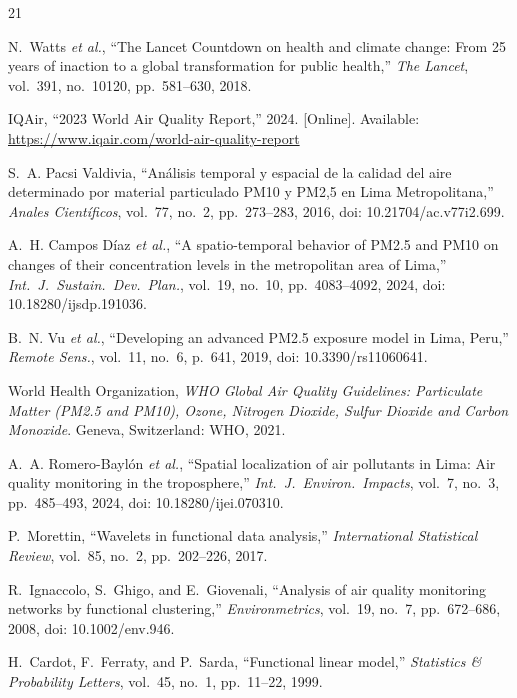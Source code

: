 \documentclass[12pt,letterpaper]{article}
\begin{document}
\begin{thebibliography}{21}

N.~Watts \textit{et al.},
``The Lancet Countdown on health and climate change: From 25 years of inaction to a global transformation for public health,''
\textit{The Lancet}, vol.~391, no.~10120, pp.~581--630, 2018.

IQAir, ``2023 World Air Quality Report,'' 2024. [Online].
Available: \url{https://www.iqair.com/world-air-quality-report}

S.~A. Pacsi Valdivia,
``An\'alisis temporal y espacial de la calidad del aire determinado por material particulado PM10 y PM2,5 en Lima Metropolitana,''
\textit{Anales Cient\'ificos}, vol.~77, no.~2, pp.~273--283, 2016, doi: 10.21704/ac.v77i2.699.

A.~H. Campos D\'iaz \textit{et al.},
``A spatio-temporal behavior of PM2.5 and PM10 on changes of their concentration levels in the metropolitan area of Lima,''
\textit{Int.\ J.\ Sustain.\ Dev.\ Plan.}, vol.~19, no.~10, pp.~4083--4092, 2024, doi: 10.18280/ijsdp.191036.

B.~N. Vu \textit{et al.},
``Developing an advanced PM2.5 exposure model in Lima, Peru,''
\textit{Remote Sens.}, vol.~11, no.~6, p.~641, 2019, doi: 10.3390/rs11060641.

World Health Organization,
\textit{WHO Global Air Quality Guidelines: Particulate Matter (PM2.5 and PM10), Ozone, Nitrogen Dioxide, Sulfur Dioxide and Carbon Monoxide}.
Geneva, Switzerland: WHO, 2021.

A.~A. Romero-Bayl\'on \textit{et al.},
``Spatial localization of air pollutants in Lima: Air quality monitoring in the troposphere,''
\textit{Int.\ J.\ Environ.\ Impacts}, vol.~7, no.~3, pp.~485--493, 2024, doi: 10.18280/ijei.070310.

P.~Morettin,
``Wavelets in functional data analysis,''
\textit{International Statistical Review}, vol.~85, no.~2, pp.~202--226, 2017.

R.~Ignaccolo, S.~Ghigo, and E.~Giovenali,
``Analysis of air quality monitoring networks by functional clustering,''
\textit{Environmetrics}, vol.~19, no.~7, pp.~672--686, 2008, doi: 10.1002/env.946.

H.~Cardot, F.~Ferraty, and P.~Sarda,
``Functional linear model,''
\textit{Statistics \& Probability Letters}, vol.~45, no.~1, pp.~11--22, 1999.


\end{thebibliography}
\end{document}
